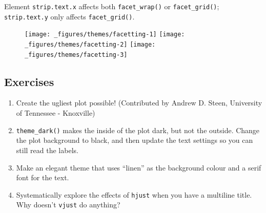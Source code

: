 Element \texttt{strip.text.x} affects both \texttt{facet\_wrap()} or
\texttt{facet\_grid()}; \texttt{strip.text.y} only affects
\texttt{facet\_grid()}.

\begin{Shaded}
\begin{Highlighting}[]
\StringTok{ }\NormalTok{(} \NormalTok{:}\NormalTok{, } \NormalTok{:}\NormalTok{, } \NormalTok{(}\NormalTok{, }\NormalTok{, }\NormalTok{, }\NormalTok{))}
\StringTok{ }\StringTok{ }\NormalTok{() +}\StringTok{ }

\StringTok{ }\NormalTok{(} \NormalTok{(}\NormalTok{, }\NormalTok{))}
\StringTok{ }\NormalTok{(}
   \NormalTok{(} \NormalTok{, } \NormalTok{, } \NormalTok{),}
   \NormalTok{(} \NormalTok{)}
\NormalTok{)}
\end{Highlighting}
\end{Shaded}

\begin{figure}[H]
  \texttt{[image: \_figures/themes/facetting-1]}%
  \texttt{[image: \_figures/themes/facetting-2]}%
  \texttt{[image: \_figures/themes/facetting-3]}
\end{figure}

\subsection{Exercises}\label{exercises-1}

\begin{enumerate}
\def\labelenumi{\arabic{enumi}.}
\item
  Create the ugliest plot possible! (Contributed by Andrew D. Steen,
  University of Tennessee - Knoxville)
\item
  \texttt{theme\_dark()} makes the inside of the plot dark, but not the
  outside. Change the plot background to black, and then update the text
  settings so you can still read the labels.
\item
  Make an elegant theme that uses ``linen'' as the background colour and
  a serif font for the text.
\item
  Systematically explore the effects of \texttt{hjust} when you have a
  multiline title. Why doesn't \texttt{vjust} do anything?
\end{enumerate}

